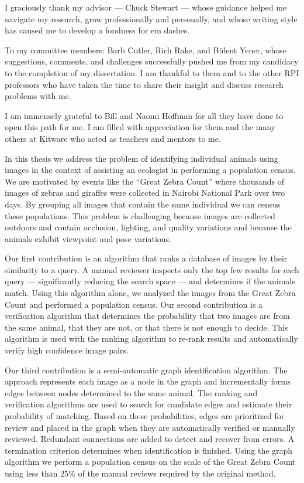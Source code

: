 \documentclass[chap]{thesis}
\begin{document}
I graciously thank my advisor --- Chuck Stewart --- whose guidance helped me navigate my research, grow
  professionally and personally, and whose writing style has caused me to develop a fondness for em dashes.

To my committee members:
Barb Cutler, Rich Rake, and Bülent Yener, whose suggestions, comments, and challenges successfully pushed me from
  my candidacy to the completion of my dissertation.
I am thankful to them and to the other RPI professors who have taken the time to share their insight and discuss
  research problems with me.

I am immensely grateful to Bill and Naomi Hoffman for all they have done to open this path for me.
I am filled with appreciation for them and the many others at Kitware who acted as teachers and mentors to me.



In this thesis we address the problem of identifying individual animals using images in the context of assisting
  an ecologist in performing a population census.
We are motivated by events like the ``Great Zebra Count'' where thousands of images of zebras and giraffes were
  collected in Nairobi National Park over two days.
By grouping all images that contain the same individual we can census these populations.
This problem is challenging because images are collected outdoors and contain occlusion, lighting, and quality
  variations and because the animals exhibit viewpoint and pose variations.

Our first contribution is an algorithm that ranks a database of images by their similarity to a query.
A manual reviewer inspects only the top few results for each query --- significantly reducing the search space
  --- and determines if the animals match.
Using this algorithm alone, we analyzed the images from the Great Zebra Count and performed a population census.
Our second contribution is a verification algorithm that determines the probability that two images are from the
  same animal, that they are not, or that there is not enough to decide.
This algorithm is used with the ranking algorithm to re-rank results and automatically verify high confidence
  image pairs.

Our third contribution is a semi-automatic graph identification algorithm.
The approach represents each image as a node in the graph and incrementally forms edges between nodes determined
  to the same animal.
The ranking and verification algorithms are used to search for candidate edges and estimate their probability of
  matching.
Based on these probabilities, edges are prioritized for review and placed in the graph when they are automatically
  verified or manually reviewed.
Redundant connections are added to detect and recover from errors.
A termination criterion determines when identification is finished.
Using the graph algorithm we perform a population census on the scale of the Great Zebra Count using less than
  $25\percent$ of the manual reviews required by the original method.
\end{document}
